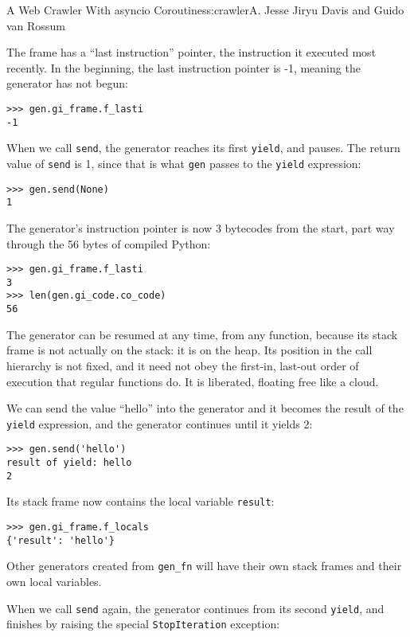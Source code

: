 \begin{aosachapter}{A Web Crawler With asyncio Coroutines}{s:crawler}{A. Jesse Jiryu Davis and Guido van Rossum}

The frame has a ``last instruction'' pointer, the instruction it
executed most recently. In the beginning, the last instruction pointer
is -1, meaning the generator has not begun:

\begin{verbatim}
>>> gen.gi_frame.f_lasti
-1
\end{verbatim}

When we call \texttt{send}, the generator reaches its first
\texttt{yield}, and pauses. The return value of \texttt{send} is 1,
since that is what \texttt{gen} passes to the \texttt{yield} expression:

\begin{verbatim}
>>> gen.send(None)
1
\end{verbatim}

The generator's instruction pointer is now 3 bytecodes from the start,
part way through the 56 bytes of compiled Python:

\begin{verbatim}
>>> gen.gi_frame.f_lasti
3
>>> len(gen.gi_code.co_code)
56
\end{verbatim}

The generator can be resumed at any time, from any function, because its
stack frame is not actually on the stack: it is on the heap. Its
position in the call hierarchy is not fixed, and it need not obey the
first-in, last-out order of execution that regular functions do. It is
liberated, floating free like a cloud.

We can send the value ``hello'' into the generator and it becomes the
result of the \texttt{yield} expression, and the generator continues
until it yields 2:

\begin{verbatim}
>>> gen.send('hello')
result of yield: hello
2
\end{verbatim}

Its stack frame now contains the local variable \texttt{result}:

\begin{verbatim}
>>> gen.gi_frame.f_locals
{'result': 'hello'}
\end{verbatim}

Other generators created from \texttt{gen\_fn} will have their own stack
frames and their own local variables.

When we call \texttt{send} again, the generator continues from its
second \texttt{yield}, and finishes by raising the special
\texttt{StopIteration} exception:


\end{aosachapter}
